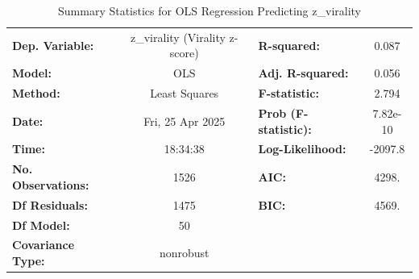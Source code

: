 \documentclass[12pt,a4paper]{report}
\begin{document}
\begin{table}
    \centering
    \captionsetup{justification=centering}
    \caption{Summary Statistics for OLS Regression Predicting z\_virality}
    \label{tab:ols_virality_summary}
    \scriptsize %
    \setlength{\tabcolsep}{3pt} %

    \begin{tabular}{lclc}
        \toprule
        \textbf{Dep. Variable:}     & z\_virality (Virality z-score) & \textbf{R-squared:}         & 0.087   \\
        \textbf{Model:}             & OLS                            & \textbf{Adj. R-squared:}    & 0.056   \\
        \textbf{Method:}            & Least Squares                  & \textbf{F-statistic:}       & 2.794   \\
        \textbf{Date:}              & Fri, 25 Apr 2025               & \textbf{Prob (F-statistic):} & 7.82e-10 \\
        \textbf{Time:}              & 18:34:38                       & \textbf{Log-Likelihood:}    & -2097.8 \\
        \textbf{No. Observations:}  & 1526                           & \textbf{AIC:}               & 4298.   \\
        \textbf{Df Residuals:}      & 1475                           & \textbf{BIC:}               & 4569.   \\
        \textbf{Df Model:}          & 50                             & \textbf{}                   &         \\
        \textbf{Covariance Type:}   & nonrobust                      & \textbf{}                   &         \\
        \bottomrule
    \end{tabular}
\end{table}
\end{document}
